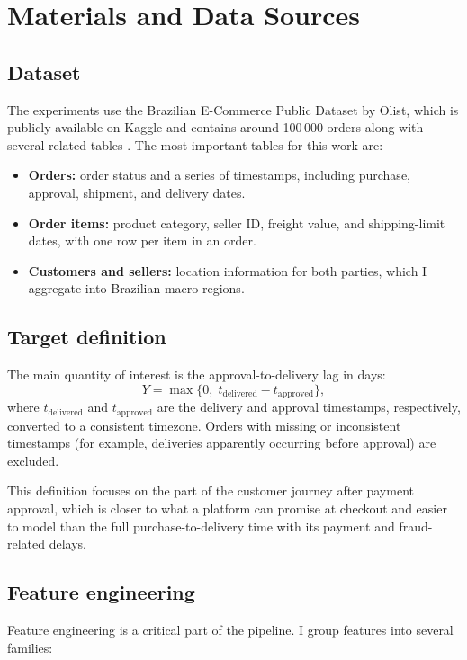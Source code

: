 \documentclass[10pt,twocolumn]{article}
\begin{document}
\section{Materials and Data Sources}
\subsection{Dataset}
The experiments use the Brazilian E-Commerce Public Dataset by Olist, which is publicly available on Kaggle and contains around 100\,000 orders along with several related tables \citep{olistdataset}. The most important tables for this work are:
\begin{itemize}
  \item \textbf{Orders:} order status and a series of timestamps, including purchase, approval, shipment, and delivery dates.
  \item \textbf{Order items:} product category, seller ID, freight value, and shipping-limit dates, with one row per item in an order.
  \item \textbf{Customers and sellers:} location information for both parties, which I aggregate into Brazilian macro-regions.
\end{itemize}

\subsection{Target definition}
The main quantity of interest is the approval-to-delivery lag in days:
\begin{equation}
  Y = \max\bigl\{0,\; t_{\text{delivered}} - t_{\text{approved}}\bigr\},
\end{equation}
where $t_{\text{delivered}}$ and $t_{\text{approved}}$ are the delivery and approval timestamps, respectively, converted to a consistent timezone. Orders with missing or inconsistent timestamps (for example, deliveries apparently occurring before approval) are excluded.

This definition focuses on the part of the customer journey after payment approval, which is closer to what a platform can promise at checkout and easier to model than the full purchase-to-delivery time with its payment and fraud-related delays.

\subsection{Feature engineering}
Feature engineering is a critical part of the pipeline. I group features into several families:
\end{document}
